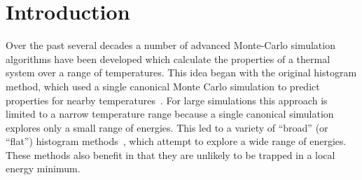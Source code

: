 \documentclass[letterpaper,twocolumn,amsmath,amssymb,pre,aps,10pt]{revtex4-1}
\begin{document}
\section{Introduction}
Over the past several decades a number of advanced Monte-Carlo
simulation algorithms have been developed which calculate the
properties of a thermal system over a range of temperatures.  This
idea began with the original histogram method, which used a single
canonical Monte Carlo simulation to predict properties for nearby
temperatures~\cite{ferrenberg1988new}.  For large simulations this
approach is limited to a narrow temperature range because a single
canonical simulation explores only a small range of energies.  This
led to a variety of ``broad'' (or ``flat'') histogram
methods~\cite{penna1996broad, penna1998broad, swendsen1999transition,
  wang2001determining, wang2001efficient, trebst2004optimizing}, which
attempt to explore a wide range of energies.  These methods also
benefit in that they are unlikely to be trapped in a local energy
minimum.
\end{document}
